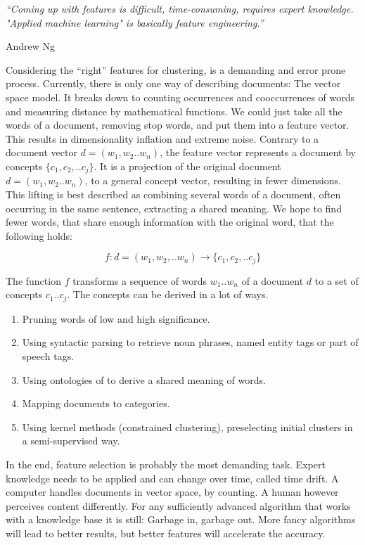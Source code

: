 \epigraph{\emph{
  ``Coming up with features is difficult, time-consuming, requires expert knowledge. "Applied machine learning" is basically feature engineering.''
}}{ Andrew Ng }

Considering the ``right'' features for clustering, is a demanding and error prone process. Currently, there is only one way of describing documents: The vector space model. It breaks down to counting occurrences and cooccurrences of words and measuring distance by mathematical functions. We could just take all the words of a document, removing stop words, and put them into a feature vector. This results in dimensionality inflation and extreme noise. Contrary to a document vector $d = (w_1,w_2..w_n)$, the feature vector represents a document by concepts $\{c_1,c_2,..c_j\}$. It is a projection of the original document $d = (w_1,w_2..w_n)$, to a general concept vector, resulting in fewer dimensions. This lifting is best described as combining several words of a document, often occurring in the same sentence, extracting a shared meaning. We hope to find fewer words, that share enough information with the original word, that the following holds:
  
  \begin{equation}
    f : d=(w_1,w_2,..w_n) \to \{c_1,c_2,..c_j\}
  \end{equation}

The function $f$ transforms a sequence of words $w_1..w_n$ of a document $d$ to a set of concepts $c_1..c_j$. The concepts can be derived in a lot of ways.

  \begin{enumerate}
    \item Pruning words of low and high significance.
    \item Using syntactic parsing to retrieve noun phrases, named entity tags or part of speech tags.
    \item Using ontologies of \wordnet{} to derive a shared meaning of words.
    \item Mapping documents to \wiki{} categories.
    \item Using kernel methods (constrained clustering), preselecting initial clusters in a semi-supervised way.
  \end{enumerate}

In the end, feature selection is probably the most demanding task. Expert knowledge needs to be applied and can change over time, called time drift. A computer handles documents in vector space, by counting. A human however perceives content differently. For any sufficiently advanced algorithm that works with a knowledge base it is still: Garbage in, garbage out. More fancy algorithms will lead to better results, but better features will accelerate the accuracy.\\

